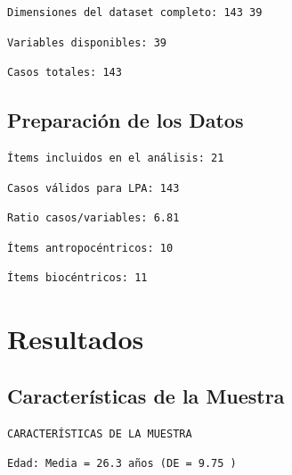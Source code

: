 \documentclass[
  11pt,
  letterpaper,
  DIV=11,
  numbers=noendperiod]{scrartcl}
\begin{document}
\begin{verbatim}
Dimensiones del dataset completo: 143 39 
\end{verbatim}

\begin{verbatim}
Variables disponibles: 39 
\end{verbatim}

\begin{verbatim}
Casos totales: 143 
\end{verbatim}

\subsection{Preparación de los Datos}\label{preparaciuxf3n-de-los-datos}

\begin{verbatim}
Ítems incluidos en el análisis: 21 
\end{verbatim}

\begin{verbatim}
Casos válidos para LPA: 143 
\end{verbatim}

\begin{verbatim}
Ratio casos/variables: 6.81 
\end{verbatim}

\begin{verbatim}
Ítems antropocéntricos: 10 
\end{verbatim}

\begin{verbatim}
Ítems biocéntricos: 11 
\end{verbatim}

\newpage

\section{Resultados}\label{resultados}

\subsection{Características de la
Muestra}\label{caracteruxedsticas-de-la-muestra}

\begin{verbatim}
CARACTERÍSTICAS DE LA MUESTRA
\end{verbatim}

\begin{verbatim}
Edad: Media = 26.3 años (DE = 9.75 )
\end{verbatim}
\end{document}
